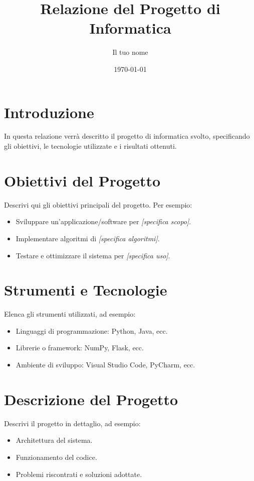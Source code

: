 \documentclass[a4paper,12pt]{article}
\title{Relazione del Progetto di Informatica}
\author{Il tuo nome}
\date{\today}
\begin{document}
\maketitle

\tableofcontents %

\newpage

\section{Introduzione}
In questa relazione verrà descritto il progetto di informatica svolto, specificando gli obiettivi, le tecnologie utilizzate e i risultati ottenuti.

\section{Obiettivi del Progetto}
Descrivi qui gli obiettivi principali del progetto. Per esempio:
\begin{itemize}
    \item Sviluppare un'applicazione/software per \textit{[specifica scopo]}.
    \item Implementare algoritmi di \textit{[specifica algoritmi]}.
    \item Testare e ottimizzare il sistema per \textit{[specifica uso]}.
\end{itemize}

\section{Strumenti e Tecnologie}
Elenca gli strumenti utilizzati, ad esempio:
\begin{itemize}
    \item Linguaggi di programmazione: Python, Java, ecc.
    \item Librerie o framework: NumPy, Flask, ecc.
    \item Ambiente di sviluppo: Visual Studio Code, PyCharm, ecc.
\end{itemize}

\section{Descrizione del Progetto}
Descrivi il progetto in dettaglio, ad esempio:
\begin{itemize}
    \item Architettura del sistema.
    \item Funzionamento del codice.
    \item Problemi riscontrati e soluzioni adottate.
\end{itemize}
\end{document}
